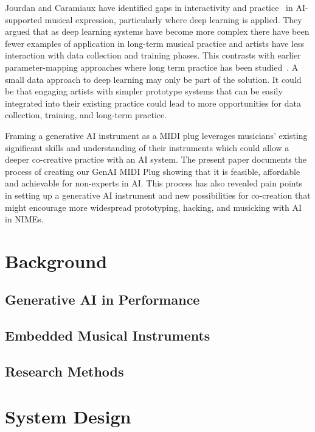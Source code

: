\documentclass[manuscript,review,anonymous]{acmart}
\begin{document}
Jourdan and Caramiaux have identified gaps in interactivity and practice~\cite{jourdan_nime_ml_review} in AI-supported musical expression, particularly where deep learning is applied. 
They argued that as deep learning systems have become more complex there have been fewer examples of application in long-term musical practice and artists have less interaction with data collection and training phases. 
This contrasts with earlier parameter-mapping approaches where long term practice has been studied~\cite{fiebrink_years_ml}.
A small data approach to deep learning may only be part of the solution. 
It could be that engaging artists with simpler prototype systems that can be easily integrated into their existing practice could lead to more opportunities for data collection, training, and long-term practice.

Framing a generative AI instrument as a MIDI plug leverages musicians' existing significant skills and understanding of their instruments which could allow a deeper co-creative practice with an AI system.
The present paper documents the process of creating our GenAI MIDI Plug showing that it is feasible, affordable and achievable for non-experts in AI. 
This process has also revealed pain points in setting up a generative AI instrument and new possibilities for co-creation that might encourage more widespread prototyping, hacking, and musicking with AI in NIMEs.

\section{Background}\label{background}

\subsection{Generative AI in Performance}

\subsection{Embedded Musical Instruments}

\subsection{Research Methods}



\section{System Design}\label{sys-design}
\end{document}
